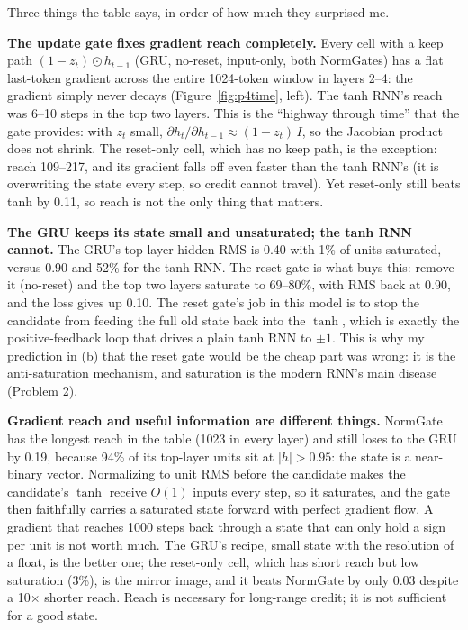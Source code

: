 Three things the table says, in order of how much they surprised me.

\textbf{The update gate fixes gradient reach completely.} Every cell with a keep path $(1-z_t)\odot h_{t-1}$ (GRU, no-reset, input-only, both NormGates) has a flat last-token gradient across the entire 1024-token window in layers 2--4: the gradient simply never decays (Figure~\ref{fig:p4time}, left). The tanh RNN's reach was 6--10 steps in the top two layers. This is the ``highway through time'' that the gate provides: with $z_t$ small, $\partial h_t/\partial h_{t-1}\approx(1-z_t)\,I$, so the Jacobian product does not shrink. The reset-only cell, which has no keep path, is the exception: reach 109--217, and its gradient falls off even faster than the tanh RNN's (it is overwriting the state every step, so credit cannot travel). Yet reset-only still beats tanh by 0.11, so reach is not the only thing that matters.

\textbf{The GRU keeps its state small and unsaturated; the tanh RNN cannot.} The GRU's top-layer hidden RMS is 0.40 with 1\% of units saturated, versus 0.90 and 52\% for the tanh RNN. The reset gate is what buys this: remove it (no-reset) and the top two layers saturate to 69--80\%, with RMS back at 0.90, and the loss gives up 0.10. The reset gate's job in this model is to stop the candidate from feeding the full old state back into the $\tanh$, which is exactly the positive-feedback loop that drives a plain tanh RNN to $\pm1$. This is why my prediction in (b) that the reset gate would be the cheap part was wrong: it is the anti-saturation mechanism, and saturation is the modern RNN's main disease (Problem 2).

\textbf{Gradient reach and useful information are different things.} NormGate has the longest reach in the table (1023 in every layer) and still loses to the GRU by 0.19, because 94\% of its top-layer units sit at $|h|>0.95$: the state is a near-binary vector. Normalizing to unit RMS before the candidate makes the candidate's $\tanh$ receive $O(1)$ inputs every step, so it saturates, and the gate then faithfully carries a saturated state forward with perfect gradient flow. A gradient that reaches 1000 steps back through a state that can only hold a sign per unit is not worth much. The GRU's recipe, small state with the resolution of a float, is the better one; the reset-only cell, which has short reach but low saturation (3\%), is the mirror image, and it beats NormGate by only 0.03 despite a 10$\times$ shorter reach. Reach is necessary for long-range credit; it is not sufficient for a good state.

